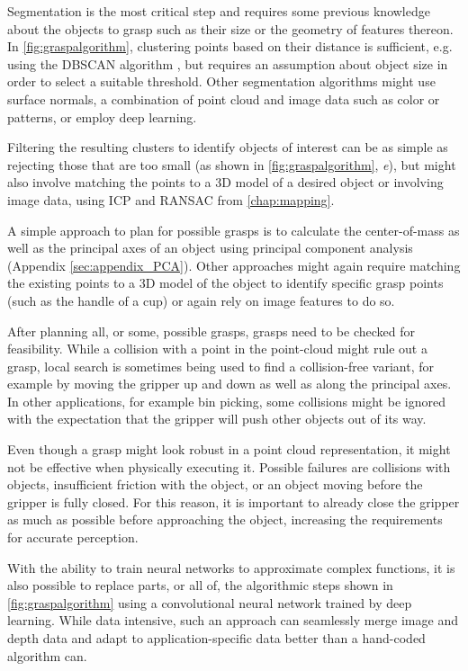 Segmentation is the most critical step and requires some previous knowledge about the objects to grasp such as their size or the geometry of features thereon. In \cref{fig:graspalgorithm}, clustering points based on their distance is sufficient, e.g. using the DBSCAN algorithm \cite{ester1996density}, but requires an assumption about object size in order to select a suitable threshold. Other segmentation algorithms might use surface normals, a combination of point cloud and image data such as color or patterns, or employ deep learning.

Filtering the resulting clusters to identify objects of interest can be as simple as rejecting those that are too small (as shown in \cref{fig:graspalgorithm}, \emph{e}), but might also involve matching the points to a 3D model of a desired object or involving image data, using ICP and RANSAC from \cref{chap:mapping}. 

A simple approach to plan for possible grasps is to calculate the center-of-mass as well as the principal axes of an object using principal component analysis (Appendix \ref{sec:appendix_PCA}). Other approaches might again require matching the existing points to a 3D model of the object to identify specific grasp points (such as the handle of a cup) or again rely on image features to do so.

After planning all, or some, possible grasps, grasps need to be checked for feasibility. While a collision with a point in the point-cloud might rule out a grasp, local search is sometimes being used to find a collision-free variant, for example by moving the gripper up and down as well as along the principal axes. In other applications, for example bin picking, some collisions might be ignored with the expectation that the gripper will push other objects out of its way.

Even though a grasp might look robust in a point cloud representation, it might not be effective when physically executing it. Possible failures are collisions with objects, insufficient friction with the object, or an object moving before the gripper is fully closed. For this reason, it is important to already close the gripper as much as possible before approaching the object, increasing the requirements for accurate perception.

With the ability to train neural networks to approximate complex functions, it is also possible to replace parts, or all of, the algorithmic steps shown in \cref{fig:graspalgorithm} using a convolutional neural network trained by deep learning. While data intensive, such an approach can seamlessly merge image and depth data and adapt to application-specific data better than a hand-coded algorithm can.

